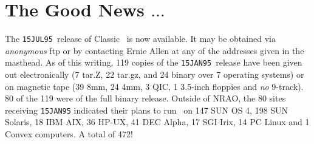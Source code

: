 

\newcommand{\AMark}{AIPSMark$^{(93)}$}
\newcommand{\AMarks}{AIPSMarks$^{(93)}$}
\newcommand{\LMark}{AIPSLoopMark$^{(93)}$}
\newcommand{\LMarks}{AIPSLoopMarks$^{(93)}$}
\newcommand{\AM}{A_m^{(93)}}
\newcommand{\ALM}{AL_m^{(93)}}

\newcommand{\AIPRELEASE}{July 15, 1995}
\newcommand{\AIPVOLUME}{Volume XV}
\newcommand{\AIPNUMBER}{Number 2}
\newcommand{\RELEASENAME}{{\tt 15JUL95}}
\newcommand{\OLDNAME}{{\tt 15JAN95}}




\newcommand{\MYSpace}{-11pt}

\normalstyle

\section{The Good News $\ldots$}

The \RELEASENAME\ release of Classic \AIPS\ is now available.  It may
be obtained via {\it anonymous} ftp or by contacting Ernie Allen at
any of the addresses given in the masthead.  As of this writing, 119
copies of the \OLDNAME\ release have been given out electronically (7
tar.Z, 22 tar.gz, and 24 binary over 7 operating systems) or on
magnetic tape (39 8mm, 24 4mm, 3 QIC, 1 3.5-inch floppies and {\it no}
9-track).  80 of the 119 were of the full binary release.  Outside of
NRAO, the 80 sites receiving {\tt 15JAN95} indicated their plans to
run \AIPS\ on 147 SUN OS 4, 198 SUN Solaris, 18 IBM AIX, 36 HP-UX, 41
DEC Alpha, 17 SGI Irix, 14 PC Linux and 1 Convex computers.  A total
of 472!

